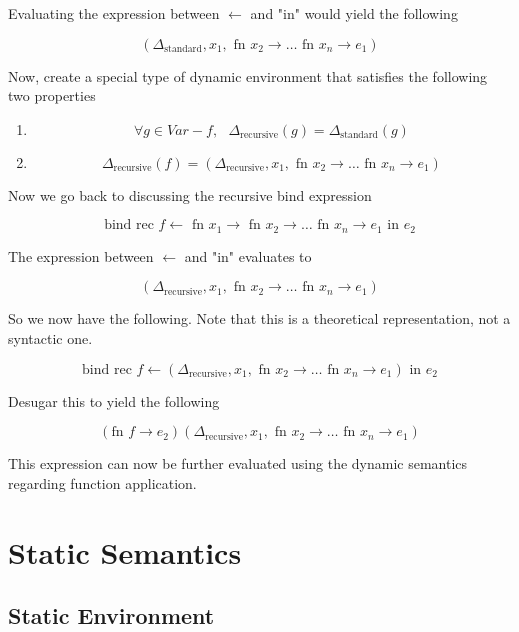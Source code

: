 \documentclass[titlepage]{article}
\begin{document}
Evaluating the expression between $\leftarrow$ and "in" would yield the following

$$(\Delta_{\text{standard}}, x_1, \text{ fn } x_2 \rightarrow \dots \text{ fn } x_n \rightarrow e_1)$$

Now, create a special type of dynamic environment that satisfies the following two properties

\begin{enumerate}
\item $$\forall g \in Var - f, \text{ } \Delta_\text{recursive} (g) = \Delta_\text{standard}(g)$$



\item $$\Delta_\text{recursive}(f) = (\Delta_{\text{recursive}}, x_1, \text{ fn } x_2 \rightarrow \dots \text{ fn } x_n \rightarrow e_1)$$


\end{enumerate}

Now we go back to discussing the recursive bind expression

$$\text{bind rec } f \leftarrow \text{ fn } x_1 \rightarrow \text{ fn } x_2 \rightarrow \dots \text{ fn } x_n \rightarrow e_1 \text{ in } e_2$$

The expression between $\leftarrow$ and "in" evaluates to

$$(\Delta_{\text{recursive}}, x_1, \text{ fn } x_2 \rightarrow \dots \text{ fn } x_n \rightarrow e_1)$$

So we now have the following. Note that this is a theoretical representation, not a syntactic one.

$$\text{bind rec } f \leftarrow (\Delta_{\text{recursive}}, x_1, \text{ fn } x_2 \rightarrow \dots \text{ fn } x_n \rightarrow e_1) \text{ in } e_2$$

Desugar this to yield the following

$$(\text{fn } f \rightarrow e_2) (\Delta_{\text{recursive}}, x_1, \text{ fn } x_2 \rightarrow \dots \text{ fn } x_n \rightarrow e_1)$$

This expression can now be further evaluated using the dynamic semantics regarding function application.

\newpage

\section{Static Semantics}

\subsection{Static Environment}
\end{document}
